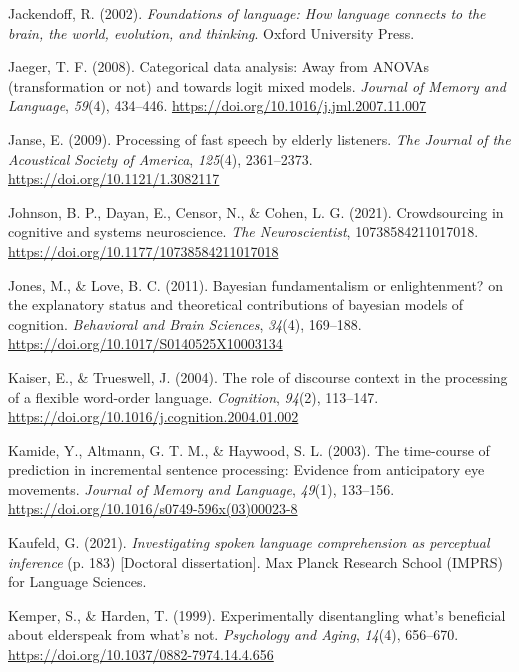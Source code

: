 \documentclass[a4paper, nobind]{templates/ociamthesis}
\newlength{\cslhangindent}
\newenvironment{CSLReferences}[2] %
 {%
  \setlength{\parindent}{0pt}
  \ifodd #1
  \let\oldpar\par
  \def\par{\hangindent=\cslhangindent\oldpar}
  \fi
  \setlength{\parskip}{1mm}
  \setlength{\baselineskip}{6mm}
 }%
 {}
\begin{document}
\begin{CSLReferences}{1}{0}
\leavevmode{}%
Jackendoff, R. (2002). \emph{Foundations of language: How language connects to the brain, the world, evolution, and thinking}. Oxford University Press.

\leavevmode{}%
Jaeger, T. F. (2008). {Categorical data analysis: Away from ANOVAs (transformation or not) and towards logit mixed models}. \emph{Journal of Memory and Language}, \emph{59}(4), 434--446. \url{https://doi.org/10.1016/j.jml.2007.11.007}

\leavevmode{}%
Janse, E. (2009). {Processing of fast speech by elderly listeners}. \emph{The Journal of the Acoustical Society of America}, \emph{125}(4), 2361--2373. \url{https://doi.org/10.1121/1.3082117}

\leavevmode{}%
Johnson, B. P., Dayan, E., Censor, N., \& Cohen, L. G. (2021). {Crowdsourcing in cognitive and systems neuroscience}. \emph{The Neuroscientist}, 10738584211017018. \url{https://doi.org/10.1177/10738584211017018}

\leavevmode{}%
Jones, M., \& Love, B. C. (2011). {Bayesian fundamentalism or enlightenment? on the explanatory status and theoretical contributions of bayesian models of cognition}. \emph{Behavioral and Brain Sciences}, \emph{34}(4), 169--188. \url{https://doi.org/10.1017/S0140525X10003134}

\leavevmode{}%
Kaiser, E., \& Trueswell, J. (2004). The role of discourse context in the processing of a flexible word-order language. \emph{Cognition}, \emph{94}(2), 113--147. \url{https://doi.org/10.1016/j.cognition.2004.01.002}

\leavevmode{}%
Kamide, Y., Altmann, G. T. M., \& Haywood, S. L. (2003). The time-course of prediction in incremental sentence processing: Evidence from anticipatory eye movements. \emph{Journal of Memory and Language}, \emph{49}(1), 133--156. \url{https://doi.org/10.1016/s0749-596x(03)00023-8}

\leavevmode{}%
Kaufeld, G. (2021). \emph{Investigating spoken language comprehension as perceptual inference} (p. 183) {[}Doctoral dissertation{]}. Max Planck Research School (IMPRS) for Language Sciences.

\leavevmode{}%
Kemper, S., \& Harden, T. (1999). {Experimentally disentangling what's beneficial about elderspeak from what's not}. \emph{Psychology and Aging}, \emph{14}(4), 656--670. \url{https://doi.org/10.1037/0882-7974.14.4.656}


\end{CSLReferences}
\end{document}
